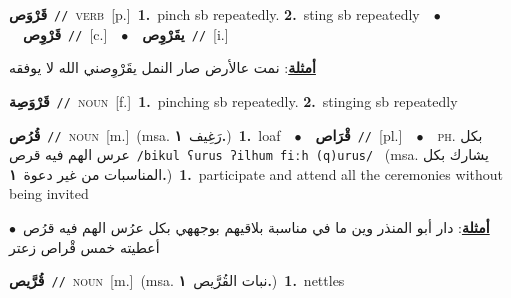 \documentclass[10pt,a4paper,twoside]{article} %
\begin{document}
\begin{multicols}{2}
{\setlength\topsep{0pt}\textbf{\foreignlanguage{arabic}{قَرْوَص}}\ {\color{gray}\texttt{//}\color{black}}\ \textsc{verb}\ [p.]\ \textbf{1.}~pinch sb repeatedly.  \textbf{2.}~sting sb repeatedly\ \ $\bullet$\ \ \setlength\topsep{0pt}\textbf{\foreignlanguage{arabic}{قَرْوِص}}\ {\color{gray}\texttt{//}\color{black}}\ [c.]\ \ $\bullet$\ \ \setlength\topsep{0pt}\textbf{\foreignlanguage{arabic}{يقَرْوِص}}\ {\color{gray}\texttt{//}\color{black}}\ [i.]\  \begin{flushright}\color{gray}\foreignlanguage{arabic}{\textbf{\underline{\foreignlanguage{arabic}{أمثلة}}}: نمت عالأرض صار النمل يقَرْوِصني الله لا يوفقه}\end{flushright}\color{black}} \vspace{2mm}

{\setlength\topsep{0pt}\textbf{\foreignlanguage{arabic}{قَرْوَصِة}}\ {\color{gray}\texttt{//}\color{black}}\ \textsc{noun}\ [f.]\ \textbf{1.}~pinching sb repeatedly.  \textbf{2.}~stinging sb repeatedly\ } \vspace{2mm}

{\setlength\topsep{0pt}\textbf{\foreignlanguage{arabic}{قُرُص}}\ {\color{gray}\texttt{//}\color{black}}\ \textsc{noun}\ [m.]\ \color{gray}(msa. \foreignlanguage{arabic}{رَغِيف}~\foreignlanguage{arabic}{\textbf{١.}})\color{black}\ \textbf{1.}~loaf\ \ $\bullet$\ \ \setlength\topsep{0pt}\textbf{\foreignlanguage{arabic}{قْرَاص}}\ {\color{gray}\texttt{//}\color{black}}\ [pl.]\ \ $\bullet$\ \ \textsc{ph.} \color{gray} \foreignlanguage{arabic}{بكل عرس الهم فيه قرص}\color{black}\ {\color{gray}\texttt{/{\sffamily bikul ʕurus ʔilhum fiːh (q)urus}/}\color{black}}\ \color{gray} (msa. \foreignlanguage{arabic}{يشارك بكل المناسبات من غير دعوة}~\foreignlanguage{arabic}{\textbf{١.}})\color{black}\ \textbf{1.}~participate and attend all the ceremonies without being invited\  \begin{flushright}\color{gray}\foreignlanguage{arabic}{\textbf{\underline{\foreignlanguage{arabic}{أمثلة}}}: دار أبو المنذر وين ما في مناسبة بلاقيهم بوجههي بكل عرُس الهم فيه قرُص\ $\bullet$\ \  أعطيته خمس قْراص زعتر}\end{flushright}\color{black}} \vspace{2mm}

{\setlength\topsep{0pt}\textbf{\foreignlanguage{arabic}{قُرَّيص}}\ {\color{gray}\texttt{//}\color{black}}\ \textsc{noun}\ [m.]\ \color{gray}(msa. \foreignlanguage{arabic}{نبات القُرَّيص}~\foreignlanguage{arabic}{\textbf{١.}})\color{black}\ \textbf{1.}~nettles\ } \vspace{2mm}


\end{multicols}
\end{document}

